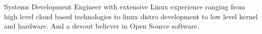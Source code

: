 Systems Development Engineer with extensive Linux experience ranging
from high level cloud based technologies to linux distro development
to low level kernel and hardware.
And a devout believer in Open Source software.
